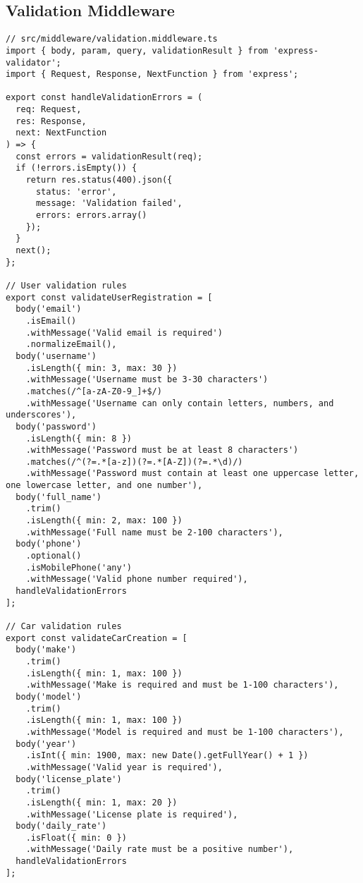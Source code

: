 \documentclass[12pt,a4paper]{article}
\begin{document}
\subsection{Validation Middleware}
\begin{lstlisting}[caption=Input Validation Middleware]
// src/middleware/validation.middleware.ts
import { body, param, query, validationResult } from 'express-validator';
import { Request, Response, NextFunction } from 'express';

export const handleValidationErrors = (
  req: Request,
  res: Response,
  next: NextFunction
) => {
  const errors = validationResult(req);
  if (!errors.isEmpty()) {
    return res.status(400).json({
      status: 'error',
      message: 'Validation failed',
      errors: errors.array()
    });
  }
  next();
};

// User validation rules
export const validateUserRegistration = [
  body('email')
    .isEmail()
    .withMessage('Valid email is required')
    .normalizeEmail(),
  body('username')
    .isLength({ min: 3, max: 30 })
    .withMessage('Username must be 3-30 characters')
    .matches(/^[a-zA-Z0-9_]+$/)
    .withMessage('Username can only contain letters, numbers, and underscores'),
  body('password')
    .isLength({ min: 8 })
    .withMessage('Password must be at least 8 characters')
    .matches(/^(?=.*[a-z])(?=.*[A-Z])(?=.*\d)/)
    .withMessage('Password must contain at least one uppercase letter, one lowercase letter, and one number'),
  body('full_name')
    .trim()
    .isLength({ min: 2, max: 100 })
    .withMessage('Full name must be 2-100 characters'),
  body('phone')
    .optional()
    .isMobilePhone('any')
    .withMessage('Valid phone number required'),
  handleValidationErrors
];

// Car validation rules
export const validateCarCreation = [
  body('make')
    .trim()
    .isLength({ min: 1, max: 100 })
    .withMessage('Make is required and must be 1-100 characters'),
  body('model')
    .trim()
    .isLength({ min: 1, max: 100 })
    .withMessage('Model is required and must be 1-100 characters'),
  body('year')
    .isInt({ min: 1900, max: new Date().getFullYear() + 1 })
    .withMessage('Valid year is required'),
  body('license_plate')
    .trim()
    .isLength({ min: 1, max: 20 })
    .withMessage('License plate is required'),
  body('daily_rate')
    .isFloat({ min: 0 })
    .withMessage('Daily rate must be a positive number'),
  handleValidationErrors
];
\end{lstlisting}
\end{document}
